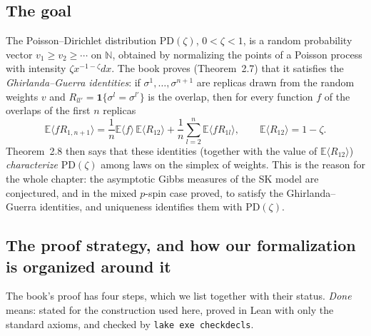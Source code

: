 \subsection*{The goal}

The Poisson--Dirichlet distribution $\mathrm{PD}(\zeta)$, $0<\zeta<1$, is a random probability vector $v_1\ge v_2\ge\cdots$ on $\mathbb N$, obtained by normalizing the points of a Poisson process with intensity $\zeta x^{-1-\zeta}dx$. The book proves (Theorem~2.7) that it satisfies the \emph{Ghirlanda--Guerra identities}: if $\sigma^1,\dots,\sigma^{n+1}$ are replicas drawn from the random weights $v$ and $R_{ll'}=\mathbf 1\{\sigma^l=\sigma^{l'}\}$ is the overlap, then for every function $f$ of the overlaps of the first $n$ replicas
\[\mathbb E\langle fR_{1,n+1}\rangle=\frac1n\mathbb E\langle f\rangle\,\mathbb E\langle R_{12}\rangle+\frac1n\sum_{l=2}^n\mathbb E\langle fR_{1l}\rangle,\qquad\mathbb E\langle R_{12}\rangle=1-\zeta.\]
Theorem~2.8 then says that these identities (together with the value of $\mathbb E\langle R_{12}\rangle$) \emph{characterize} $\mathrm{PD}(\zeta)$ among laws on the simplex of weights. This is the reason for the whole chapter: the asymptotic Gibbs measures of the SK model are conjectured, and in the mixed $p$-spin case proved, to satisfy the Ghirlanda--Guerra identities, and uniqueness identifies them with $\mathrm{PD}(\zeta)$.

\subsection*{The proof strategy, and how our formalization is organized around it}

The book's proof has four steps, which we list together with their status. \emph{Done} means: stated for the construction used here, proved in Lean with only the standard axioms, and checked by \texttt{lake exe checkdecls}.

